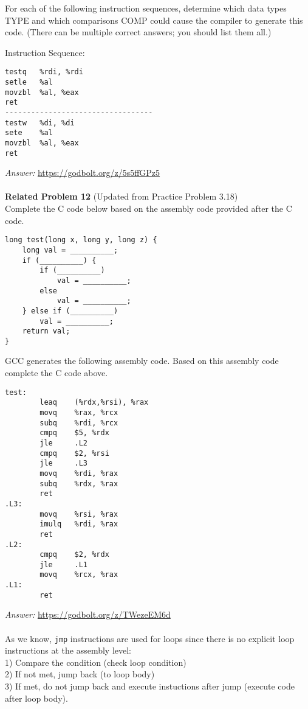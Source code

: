 \documentclass{article}
\begin{document}
\noindent For each of the following instruction sequences, determine which data 
types TYPE and which comparisons COMP could cause the compiler to 
generate this code. (There can be multiple correct answers; you should 
list them all.)

\noindent Instruction Sequence:
\begin{verbatim}
testq   %rdi, %rdi
setle   %al
movzbl  %al, %eax
ret
----------------------------------
testw   %di, %di
sete    %al
movzbl  %al, %eax
ret
\end{verbatim}

\noindent\textit{Answer: }\url{https://godbolt.org/z/5s5ffGPz5} \\
\\
\noindent\textbf{Related Problem 12} (Updated from Practice Problem 3.18) \\

Complete the C code below based on the assembly code provided after the C code.

\begin{verbatim}
long test(long x, long y, long z) {
    long val = __________;
    if (__________) {
        if (__________)
            val = __________;
        else
            val = __________;
    } else if (__________)
        val = __________;
    return val;
}
\end{verbatim}
GCC generates the following assembly code. Based on this assembly code complete the C code above.
\begin{verbatim}
test:
        leaq    (%rdx,%rsi), %rax
        movq    %rax, %rcx
        subq    %rdi, %rcx
        cmpq    $5, %rdx
        jle     .L2
        cmpq    $2, %rsi
        jle     .L3
        movq    %rdi, %rax
        subq    %rdx, %rax
        ret
.L3:
        movq    %rsi, %rax
        imulq   %rdi, %rax
        ret
.L2:
        cmpq    $2, %rdx
        jle     .L1
        movq    %rcx, %rax
.L1:
        ret
\end{verbatim}

\noindent\textit{Answer: }\url{https://godbolt.org/z/TWezeEM6d} \\
\\
As we know, \texttt{jmp} instructions are used for loops since there is no explicit loop instructions at the assembly level: \\
1) Compare the condition (check loop condition) \\
2) If not met, jump back (to loop body) \\
3) If met, do not jump back and execute instuctions after jump (execute code after loop body).\\
\end{document}
